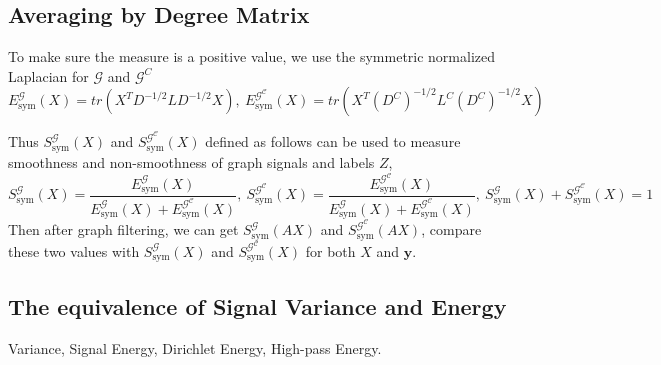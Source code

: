 \documentclass{article}
\newcommand{\0}{{\boldsymbol{0}}}
\newcommand{\6}{{\partial}}
\newcommand{\8}{{\infty}}
\newcommand{\4}{{\nabla}}
\begin{document}
\subsection{Averaging by Degree Matrix}
To make sure the measure is a positive value, we use the symmetric normalized Laplacian for $\mathcal{G}$ and $\mathcal{G}^C$
\begin{equation}  
    E_{\text{sym}}^\mathcal{G}({X}) = tr\left({X}^T D^{-1/2} L D^{-1/2} {X}\right),\ E_{\text{sym}}^\mathcal{G^C}({X}) = tr\left({X}^T (D^C)^{-1/2} L^C (D^C)^{-1/2} {X}\right)
\end{equation}

Thus $S_{\text{sym}}^\mathcal{G}(X)$ and $S_{\text{sym}}^\mathcal{G^C}(X)$ defined as follows can be used to measure smoothness and non-smoothness of graph signals and labels $Z$,
\begin{equation}  
  S_{\text{sym}}^\mathcal{G}(X) = \frac{E_{\text{sym}}^\mathcal{G}({X})}{E_{\text{sym}}^\mathcal{G}({X}) + E_{\text{sym}}^\mathcal{G^C}({X})},\ S_{\text{sym}}^\mathcal{G^C}(X) = \frac{E_{\text{sym}}^\mathcal{G^C}({X})}{E_{\text{sym}}^\mathcal{G}({X}) + E_{\text{sym}}^\mathcal{G^C}({X})}, \ S_{\text{sym}}^\mathcal{G}({X}) + S_{\text{sym}}^\mathcal{G^C}({X}) = 1
\end{equation}
Then after graph filtering, we can get $S_{\text{sym}}^\mathcal{G}(A{X})$ and $S_{\text{sym}}^\mathcal{G^C}(A{X})$, compare these two values with $S_{\text{sym}}^\mathcal{G}({X})$ and $S_{\text{sym}}^\mathcal{G^C}({X})$ for both ${X}$ and $\bm{y}$.
\subsection{The equivalence of Signal Variance and Energy}
Variance, Signal Energy, Dirichlet Energy, High-pass Energy.
\end{document}
